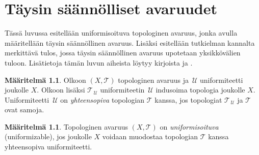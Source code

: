 \documentclass[12pt,a4paper,leqno]{report}
\newcommand{\U}{\,\mathcal{U}}
\newcommand{\T}{\mathcal{T}}
\theoremstyle{plain}
\newtheorem{kor}[equation]{Korollaari}
\theoremstyle{definition}
\newtheorem{maar}[equation]{Määritelmä}
\theoremstyle{remark}
\begin{document}
\chapter{Täysin säännölliset avaruudet}
Tässä luvussa esitellään uniformisoituva topologinen avaruus, 
jonka avulla määritellään
täysin säännöllinen avaruus.
Lisäksi esitellään tutkielman kannalta merkittävä 
tulos, jossa täysin säännöllinen avaruus upotetaan yksikkövälien tuloon. 
Lisätietoja tämän luvun aiheista löytyy kirjoista \cite[luku~IX]{Eom2} ja \cite{Dugu}.
\begin{maar}
Olkoon $(X,\T)$ topologinen avaruus ja 
$\U$ uniformiteetti joukolle $X$. 
Olkoon lisäksi $\T_{\U}$ uniformiteetin $\U$ indusoima topologia joukolle $X$. 
Uniformiteetti $\U$ on \emph{yhteensopiva} topologian $\T$ kanssa, 
jos topologiat $\T_{\U}$ ja $\T$ ovat samoja.
\end{maar}
%
\begin{maar}
Topologinen avaruus $(X,\T)$ on \emph{uniformisoituva} (uniformizable), jos joukolle $X$ voidaan muodostaa topologian $\T$ kanssa yhteensopiva uniformiteetti.
\end{maar}
\end{document}
